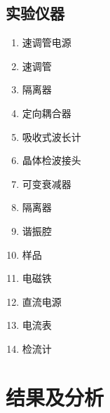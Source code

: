 \documentclass[a4paper]{article}
\begin{document}
\subsection{实验仪器}
\begin{enumerate}[(1)]
    \item 速调管电源
    \item 速调管
    \item 隔离器
    \item 定向耦合器
    \item 吸收式波长计
    \item 晶体检波接头
    \item 可变衰减器
    \item 隔离器
    \item 谐振腔
    \item 样品
    \item 电磁铁
    \item 直流电源
    \item 电流表
    \item 检流计
\end{enumerate}

\newpage
\section{结果及分析}

\end{document}
